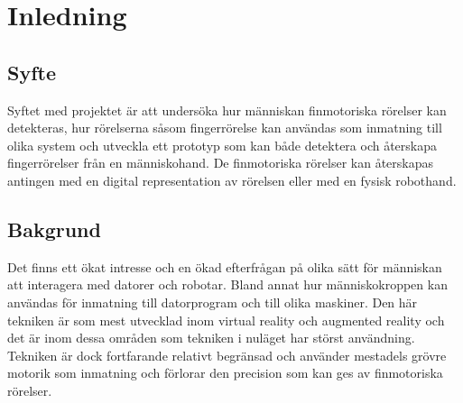 \documentclass[a4paper]{article}
\begin{document}




\begin{abstract}

\end{abstract}

\begin{otherlanguage}{english}
  \begin{abstract}
  \end{abstract}
\end{otherlanguage}

\tableofcontents

\newpage
{}

\begin{sloppypar}

  \section{Inledning}
  \subsection{Syfte}
  Syftet med projektet är att undersöka hur människan finmotoriska rörelser kan detekteras, hur rörelserna såsom fingerrörelse kan användas som inmatning till olika system
  och utveckla ett prototyp som kan både detektera och återskapa fingerrörelser från en människohand.
  De finmotoriska rörelser kan återskapas antingen med en digital representation av rörelsen eller med en fysisk robothand.
  \subsection{Bakgrund}
  Det finns ett ökat intresse och en ökad efterfrågan på olika sätt för människan att interagera med datorer och robotar.
  Bland annat hur människokroppen kan användas för inmatning till datorprogram och till olika maskiner.
  Den här tekniken är som mest utvecklad inom virtual reality och augmented reality och det är inom dessa områden som tekniken i nuläget har störst användning.
  Tekniken är dock fortfarande relativt begränsad och använder mestadels grövre motorik som inmatning och förlorar den precision som kan ges av finmotoriska rörelser.



\end{sloppypar}
\end{document}
